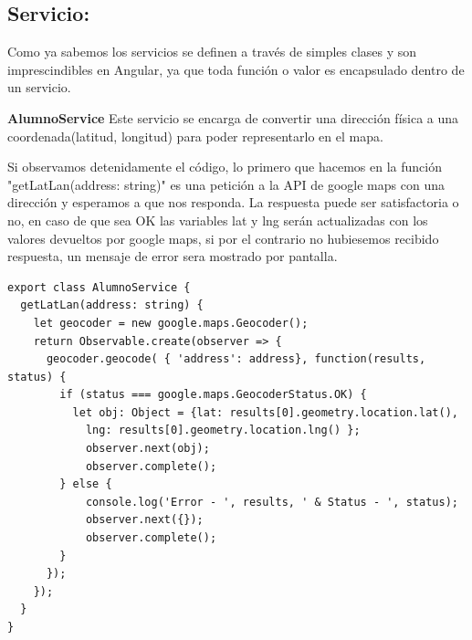 \subsection{Servicio: } Como ya sabemos los servicios se definen a través de simples clases y son imprescindibles en Angular, ya que toda función o valor es encapsulado dentro de un servicio.

\item \textbf{AlumnoService} Este servicio se encarga de convertir una dirección física a una coordenada(latitud, longitud) para poder representarlo en el mapa. 

Si observamos detenidamente el código, lo primero que hacemos en la función "getLatLan(address: string)" es una petición a la API de google maps con una dirección y esperamos a que nos responda. La respuesta puede ser satisfactoria o no, en caso de que sea OK las variables lat y lng serán actualizadas con los valores devueltos por google maps, si por el contrario no hubiesemos recibido respuesta, un mensaje de error sera mostrado por pantalla.
\begin{lstlisting}
export class AlumnoService {
  getLatLan(address: string) {
    let geocoder = new google.maps.Geocoder();
    return Observable.create(observer => {
      geocoder.geocode( { 'address': address}, function(results, status) {
        if (status === google.maps.GeocoderStatus.OK) {
          let obj: Object = {lat: results[0].geometry.location.lat(),
            lng: results[0].geometry.location.lng() };
            observer.next(obj);
            observer.complete();
        } else {
            console.log('Error - ', results, ' & Status - ', status);
            observer.next({});
            observer.complete();
        }
      });
    });
  }
}
\end{lstlisting}


